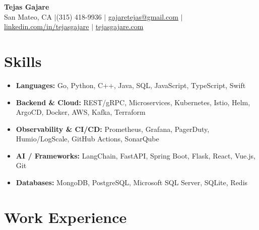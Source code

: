 \documentclass[letterpaper,10pt]{article}
\begin{document}
\begin{center}
  {\LARGE \textbf{Tejas Gajare}} \\[4pt]
  San Mateo, CA \enspace$|$\enspace (315) 418-9936 \enspace$|$\enspace
  \href{mailto:gajaretejas@gmail.com}{gajaretejas@gmail.com} \enspace$|$\enspace
  \href{https://linkedin.com/in/tejasgajare}{linkedin.com/in/tejasgajare} \enspace$|$\enspace
  \href{https://www.tejasgajare.com}{tejasgajare.com}
\end{center}

\section{Skills}
\begin{itemize}[leftmargin=0.15in, label={}, nosep, itemsep=3pt]
  \item \textbf{Languages:} Go, Python, C++, Java, SQL, JavaScript, TypeScript, Swift
  \item \textbf{Backend \& Cloud:} REST/gRPC, Microservices, Kubernetes, Istio, Helm, ArgoCD, Docker, AWS, Kafka, Terraform
  \item \textbf{Observability \& CI/CD:} Prometheus, Grafana, PagerDuty, Humio/LogScale, GitHub Actions, SonarQube
  \item \textbf{AI / Frameworks:} LangChain, FastAPI, Spring Boot, Flask, React, Vue.js, Git
  \item \textbf{Databases:} MongoDB, PostgreSQL, Microsoft SQL Server, SQLite, Redis
\end{itemize}

\section{Work Experience}
\end{document}
